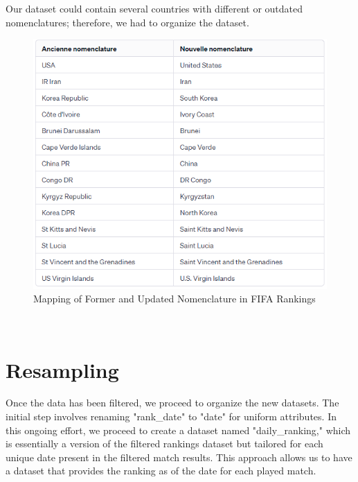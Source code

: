 Our dataset could contain several countries with different or outdated nomenclatures; therefore, we had to organize the dataset.\\
\begin{figure}[h]
  \centering
  \includegraphics[width=0.8\linewidth]{countries.png}
  \caption{Mapping of Former and Updated Nomenclature in FIFA Rankings}
\end{figure}\\

\newpage
\section{Resampling}
Once the data has been filtered, we proceed to organize the new datasets. The initial step involves renaming "rank\_date" to "date" for uniform attributes. In this ongoing effort, we proceed to create a dataset named "daily\_ranking," which is essentially a version of the filtered rankings dataset but tailored for each unique date present in the filtered match results. This approach allows us to have a dataset that provides the ranking as of the date for each played match.
